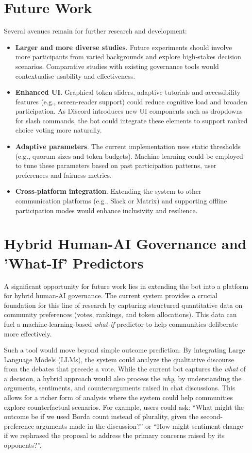 \section*{Future Work}

Several avenues remain for further research and development:

\begin{itemize}
    \item \textbf{Larger and more diverse studies}.  Future experiments
    should involve more participants from varied backgrounds and explore
    high‑stakes decision scenarios.  Comparative studies with existing
    governance tools would contextualise usability and effectiveness.
    \item \textbf{Enhanced UI}.  Graphical token sliders,
    adaptive tutorials and accessibility features (e.g., screen‑reader
    support) could reduce cognitive load and broaden participation.  As
    Discord introduces new UI components such as dropdowns for slash
    commands, the bot could integrate these elements to support ranked
    choice voting more naturally.
    \item \textbf{Adaptive parameters}.  The current implementation uses
    static thresholds (e.g., quorum sizes and token budgets).  Machine
    learning could be employed to tune these parameters based on past
    participation patterns, user preferences and fairness metrics.
    \item \textbf{Cross‑platform integration}.  Extending the system to
    other communication platforms (e.g., Slack or Matrix) and supporting
    offline participation modes would enhance inclusivity and resilience.
\end{itemize}

\section*{Hybrid Human-AI Governance and 'What-If' Predictors}

A significant opportunity for future work lies in extending the bot into a
platform for hybrid human-AI governance.  The current system provides a
crucial foundation for this line of research by capturing structured
quantitative data on community preferences (votes, rankings, and token
allocations).  This data can fuel a machine-learning-based
\emph{what-if} predictor to help communities deliberate more effectively.

Such a tool would move beyond simple outcome prediction.  By integrating
Large Language Models (LLMs), the system could analyze the qualitative
discourse from the debates that precede a vote.  While the current bot
captures the \emph{what} of a decision, a hybrid approach would also
process the \emph{why}, by understanding the arguments, sentiments, and
counterarguments raised in chat discussions.  This allows for a richer
form of analysis where the system could help communities explore
counterfactual scenarios.  For example, users could ask: ``What might the
outcome be if we used Borda count instead of plurality, given the
second-preference arguments made in the discussion?'' or ``How might
sentiment change if we rephrased the proposal to address the primary
concerns raised by its opponents?''.

